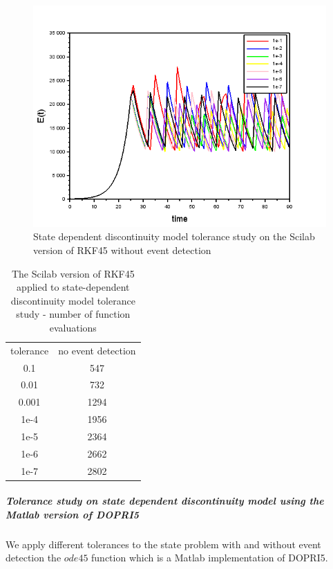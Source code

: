 \begin{figure}[h]
\centering
\includegraphics[width=0.7\linewidth]{./figures/tolerance_state_rk45_no_event_sci}
\caption{State dependent discontinuity model tolerance study on the Scilab version of RKF45 without event detection}
\label{fig:tolerance_state_rk45_no_event_sci}
\end{figure}

\begin{table}[h]
\caption {The Scilab version of RKF45 applied to state-dependent discontinuity model tolerance study - number of function evaluations} \label{tab:tolerance_state_discontinuity_rk45_scilab} 
\begin{center}
\begin{tabular}{ c c }
tolerance & no event detection \\ 
0.1 & 547 \\
0.01 & 732 \\
0.001 & 1294 \\
1e-4 & 1956 \\
1e-5 & 2364 \\
1e-6 & 2662 \\
1e-7 & 2802 \\
\end{tabular}
\end{center}
\end{table}

\subparagraph{Tolerance study on state dependent discontinuity model using the Matlab version of DOPRI5}
We apply different tolerances to the state problem with and without event detection the $ode45$ function which is a Matlab implementation of DOPRI5.

